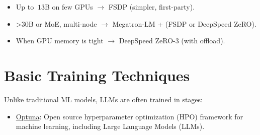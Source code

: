 \begin{itemize}
	\item Up to $~13$B on few GPUs $\to$ FSDP (simpler, first-party).
	\item >30B or MoE, multi-node $\to$ Megatron-LM + (FSDP or DeepSpeed ZeRO).
	\item When GPU memory is tight $\to$ DeepSpeed ZeRO-3 (with offload).
\end{itemize}

\section{Basic Training Techniques}

Unlike traditional ML models, LLMs are often trained in stages:

\begin{itemize}
	\item \href{https://optuna.org/}{Optuna}: Open source hyperparameter optimization (HPO) framework for machine learning, including Large Language Models (LLMs). 
\end{itemize}




